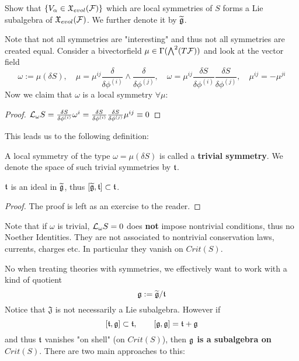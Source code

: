\begin{ex}
  Show that $\{V_\alpha \in \mathfrak{X}_{evol}({\mathcal{F}})\}$ which are local symmetries of $S$ forms a Lie subalgebra of $\mathfrak{X}_{evol}({\mathcal{F}})$. We further denote it by $\widetilde{\mathfrak{g}}$.
\end{ex}

Note that not all symmetries are "interesting" and thus not all symmetries are created equal. Consider a bivectorfield $\mu \in \Gamma(\bigwedge^2 (T{\mathcal{F}}))$ and look at the vector field
$$ \omega := \mu(\delta S), \quad \mu = \mu^{ij} \frac{\delta}{\delta \phi^{(i)}} \wedge \frac{\delta}{\delta \phi^{(j)}}, \quad \omega = \mu^{ij} \frac{\delta S}{\delta \phi^{(i)}} \frac{\delta S}{\delta \phi^{(j)}}, \quad \mu^{ij} = - \mu^{ji} $$
Now we claim that $\omega$ is a local symmetry $\forall \mu$:

\begin{proof}
  $\lie{\omega} S = \frac{\delta S}{\delta \phi^{(i)}} \omega^i = \frac{\delta S}{\delta \phi^{(i)}} \frac{\delta S}{\delta \phi^{(j)}} \mu^{ij} \equiv 0$
\end{proof}

This leads us to the following definition:

\begin{definition}
  A local symmetry of the type $\omega = \mu(\delta S)$ is called a \textbf{trivial symmetry}. We denote the space of such trivial symmetries by $\mathfrak{t}$.
\end{definition}

\begin{lem}
  $\mathfrak{t}$ is an ideal in $\widetilde{\mathfrak{g}}$, thus $[\widetilde{\mathfrak{g}}, \mathfrak{t}] \subset \mathfrak{t}$.
\begin{proof}
  The proof is left as an exercise to the reader.
\end{proof}
\end{lem}

\begin{rem}
  Note that if $\omega$ is trivial, $\mathcal{L}_{\omega}S = 0$ does \textbf{not} impose nontrivial conditions, thus no Noether Identities. They are not associated to nontrivial conservation laws, currents, charges etc. In particular they vanish on $Crit(S)$.
\end{rem}

No when treating theories with symmetries, we effectively want to work with a kind of quotient
$$ \mathfrak{g} := \widetilde{\mathfrak{g}}/\mathfrak{t}$$
Notice that $\mathfrak{J}$ is not necessarily a Lie subalgebra. However if
$$ [\mathfrak{t}, \mathfrak{g}] \subset \mathfrak{t}, \quad \quad [\mathfrak{g}, \mathfrak{g}] = \mathfrak{t} + \mathfrak{g} $$
and thus $\mathfrak{t}$ vanishes "on shell" (on $Crit(S)$), then \textbf{$\mathfrak{g}$ is a subalgebra on $Crit(S)$}. There are two main approaches to this:

